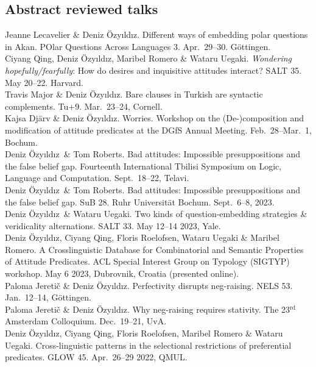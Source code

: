 \documentclass[11pt, a4paper]{article} %
\newcommand{\years}[1]{\marginnote{\scriptsize #1}} %
\newcommand{\me}{Deniz \"Ozy\i{}ld\i{}z}
\begin{document}
\subsection*{Abstract reviewed talks}
\years{2026} Jeanne Lecavelier \& \me. Different ways of embedding polar
questions in Akan. POlar Questions Across Languages 3. Apr.\ 29--30.
G\"ottingen. \\[.25em]
\years{2025} Ciyang Qing, \me, Maribel Romero \& Wataru Uegaki. \emph{Wondering
hopefully/fearfully}: How do desires and inquisitive attitudes interact? SALT
35. May 20--22. Harvard.\\[.25em]
\newpage
\years{2024} Travis Major \& \me. Bare clauses in Turkish are syntactic
complements. Tu$+$9. Mar.\ 23--24, Cornell.\\[.25em]
Kajsa Dj\"arv \& \me. Worries. Workshop on the (De-)composition
and modification of attitude predicates at the DGfS Annual Meeting. Feb.\
28--Mar.\ 1, Bochum. \\[.25em]
\years{2023} \me\ \& Tom Roberts. Bad attitudes: Impossible presuppositions and
the false belief gap. Fourteenth International Tbilisi Symposium on Logic,
Language and Computation. Sept.\ 18--22, Telavi. \\ [.25em]
\me\ \& Tom Roberts. Bad attitudes: Impossible presuppositions and
the false belief gap. SuB 28. Ruhr Universit\"at Bochum. Sept.\ 6--8, 2023. \\[.25em]
\me\ \& Wataru Uegaki. Two kinds of question-embedding strategies \&
veridicality alternations. SALT 33. May 12--14 2023, Yale. \\[.25em]
\years{2023} Deniz \"Ozy\i{}ld\i{}z, Ciyang Qing, Floris Roelofsen, Wataru
Uegaki \& Maribel Romero. A Crosslinguistic Database for Combinatorial and
Semantic Properties of Attitude Predicates. ACL Special
Interest Group on Typology (SIGTYP) workshop. May 6 2023, Dubrov\-nik, Croatia
(presented online).\\[.25em]
\years{2023} Paloma Jereti\v{c} \& \me. Perfectivity disrupts neg-raising. NELS
53. Jan.\ 12--14, G\"ottingen. \\[.25em]
\years{2022} Paloma Jereti\v{c} \& \me. Why neg-raising requires stativity. The 23$^{\text{rd}}$ Amsterdam Colloquium. Dec.\ 19--21, UvA. \\[.25em]
Deniz \"Ozy\i{}ld\i{}z, Ciyang Qing, Floris Roelofsen, Maribel Romero \& Wataru Uegaki. Cross-linguistic patterns in the selectional restrictions of preferential predicates. GLOW 45. Apr.\ 26--29 2022, QMUL.\\[.25em]
\end{document}

